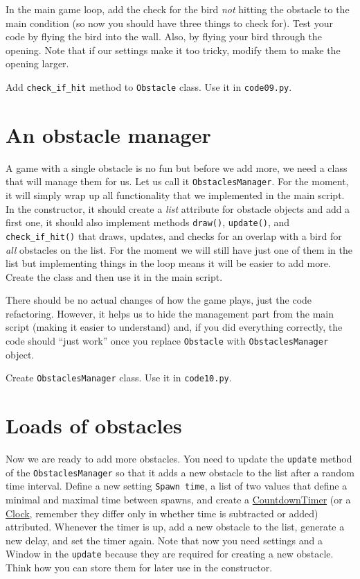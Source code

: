 \documentclass[
]{book}
\begin{document}
In the main game loop, add the check for the bird \emph{not} hitting the obstacle to the main condition (so now you should have three things to check for). Test your code by flying the bird into the wall. Also, by flying your bird through the opening. Note that if our settings make it too tricky, modify them to make the opening larger.

Add \texttt{check\_if\_hit} method to \texttt{Obstacle} class.
Use it in \texttt{code09.py}.

\hypertarget{an-obstacle-manager}{%
\section{An obstacle manager}\label{an-obstacle-manager}}

A game with a single obstacle is no fun but before we add more, we need a class that will manage them for us. Let us call it \texttt{ObstaclesManager}. For the moment, it will simply wrap up all functionality that we implemented in the main script. In the constructor, it should create a \emph{list} attribute for obstacle objects and add a first one, it should also implement methods \texttt{draw()}, \texttt{update()}, and \texttt{check\_if\_hit()} that draws, updates, and checks for an overlap with a bird for \emph{all} obstacles on the list. For the moment we will still have just one of them in the list but implementing things in the loop means it will be easier to add more. Create the class and then use it in the main script.

There should be no actual changes of how the game plays, just the code refactoring. However, it helps us to hide the management part from the main script (making it easier to understand) and, if you did everything correctly, the code should ``just work'' once you replace \texttt{Obstacle} with \texttt{ObstaclesManager} object.

Create \texttt{ObstaclesManager} class.
Use it in \texttt{code10.py}.

\hypertarget{loads-of-obstacles}{%
\section{Loads of obstacles}\label{loads-of-obstacles}}

Now we are ready to add more obstacles. You need to update the \texttt{update} method of the \texttt{ObstaclesManager} so that it adds a new obstacle to the list after a random time interval. Define a new setting \texttt{Spawn\ time}, a list of two values that define a minimal and maximal time between spawns, and create a \href{https://psychopy.org/api/clock.html\#psychopy.clock.CountdownTimer}{CountdownTimer} (or a \href{https://psychopy.org/api/clock.html\#psychopy.clock.Clock}{Clock}, remember they differ only in whether time is subtracted or added) attributed. Whenever the timer is up, add a new obstacle to the list, generate a new delay, and set the timer again. Note that now you need settings and a Window in the \texttt{update} because they are required for creating a new obstacle. Think how you can store them for later use in the constructor.
\end{document}
